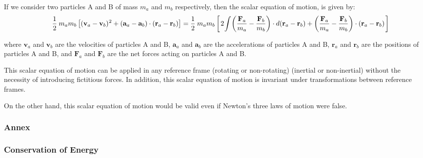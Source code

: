 \documentclass[10pt]{article}
\newcommand{\mM}{m}
\newcommand{\ra}{_a}
\newcommand{\rb}{_b}
\newcommand{\vR}{\mathbf{r}}
\newcommand{\vV}{\mathbf{v}}
\newcommand{\vA}{\mathbf{a}}
\newcommand{\vF}{\mathbf{F}}
\newcommand{\Hs}{\hspace{+2.10em}}
\begin{document}
\par If we consider two particles A and B of mass $\mM\ra$ and $\mM\rb$ respectively, then the scalar equation of motion, is given by:
{\fontsize{6}{6}\selectfont\begin{eqnarray*}
\Hs \frac{1}{2} \hspace{+0.24em} \mM\ra\mM\rb \left[(\vV\ra - \vV\rb)^{\hspace{+0.03em} 2} + (\vA\ra - \vA\rb) \cdot (\vR\ra - \vR\rb)\right] = \frac{1}{2} \hspace{+0.24em} \mM\ra\mM\rb \left[ \hspace{+0.12em} 2 \hspace{-0.12em} \int \hspace{-0.12em} \left(\frac{\vF\ra}{\mM\ra} - \frac{\vF\rb}{\mM\rb}\right) \cdot d(\vR\ra - \vR\rb) + \left(\frac{\vF\ra}{\mM\ra} - \frac{\vF\rb}{\mM\rb}\right) \cdot (\vR\ra - \vR\rb) \hspace{+0.12em} \right]
\end{eqnarray*}}
\vspace{-0.90em}
\par \noindent where $\vV\ra$ and $\vV\rb$ are the velocities of particles A and B, $\vA\ra$ and $\vA\rb$ are the accelerations of particles A and B, $\vR\ra$ and $\vR\rb$ are the positions of particles A and B, and $\vF\ra$ and $\vF\rb$ are the net forces acting on particles A and B.
\medskip
\par This scalar equation of motion can be applied in any reference frame (rotating or non-rotating) (inertial or non-inertial) without the necessity of introducing fictitious forces. In addition, this scalar equation of motion is invariant under transformations between reference frames.
\medskip
\par On the other hand, this scalar equation of motion would be valid even if Newton's three laws of motion were false.

\newpage

{\centering\subsubsection*{Annex}}

\vspace{+0.90em}

{\centering\subsubsection*{Conservation of Energy}}
\end{document}

